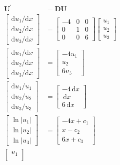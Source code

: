 \documentclass[a4paper]{article}
\newcommand{\vv}{\mathbf}
\newcommand{\dd}{\mathrm d}
\begin{document}
\[\begin{aligned}
	\vv U^\prime&=\vv D\vv U\\
	\begin{bmatrix}
		\dd u_1/\dd x\\
		\dd u_2/\dd x\\
		\dd u_3/\dd x
	\end{bmatrix}
		    &=
		    \begin{bmatrix}
			    -4&0&0\\
			    0&1&0\\
			    0&0&6
		    \end{bmatrix}
		    \begin{bmatrix}
			    u_1\\
			    u_2\\
			    u_3
		    \end{bmatrix}\\
	\begin{bmatrix}
		\dd u_1/\dd x\\
		\dd u_2/\dd x\\
		\dd u_3/\dd x
	\end{bmatrix}
		    &=
		    \begin{bmatrix}
			    -4u_1\\
			    u_2\\
			    6u_3
		    \end{bmatrix}\\
	\begin{bmatrix}
		\dd u_1/u_1\\
		\dd u_2/u_2\\
		\dd u_3/u_3
	\end{bmatrix}
		    &=
		    \begin{bmatrix}
			    -4\,\dd x\\
			    \,\dd x\\
			    6\,\dd x
		    \end{bmatrix}\\
	\begin{bmatrix}
		\ln|u_1|\\
		\ln|u_2|\\
		\ln|u_3|
	\end{bmatrix}
		    &=
		    \begin{bmatrix}
			    -4x+c_1\\
			    x+c_2\\
			    6x+c_3
		    \end{bmatrix}\\
	\begin{bmatrix}
		u_1\\

\end{bmatrix}
\end{aligned}\]
\end{document}
